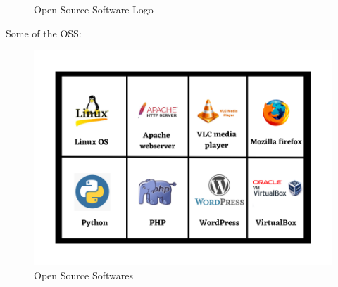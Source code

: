 \begin{flushleft}
\begin{figure}[h!]
		\caption{Open Source Software Logo}
		\label{fig:opensource}
	\end{figure}
	Some of the OSS:
	\begin{figure}[h!]
		\centering
		\includegraphics[scale=.4]{content/chapter1/images/opensource.png}
		\caption{Open Source Softwares}
		\label{fig:opensource1}
	\end{figure}
	
\end{flushleft}
\newpage
